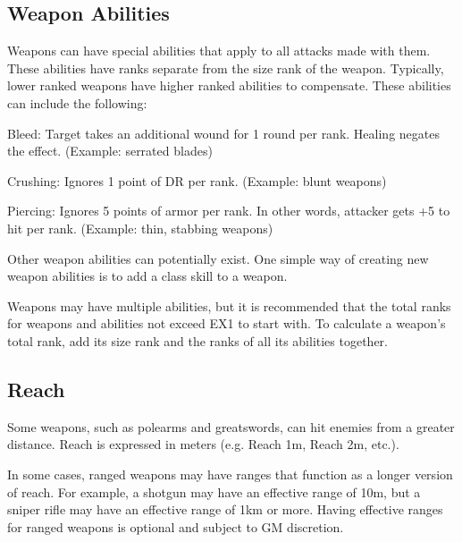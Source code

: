\begin{multicols}{2}

\subsection{Weapon Abilities}
Weapons can have special abilities that apply to all attacks made with them. These abilities have ranks separate from the size rank of the weapon. Typically, lower ranked weapons have higher ranked abilities to compensate. These abilities can include the following:
\begin{wldescription}
\item [Bleed:] Target takes an additional wound for 1 round per rank. Healing negates the effect. (Example: serrated blades)
\item [Crushing:] Ignores 1 point of DR per rank. (Example: blunt weapons)
\item [Piercing:] Ignores 5 points of armor per rank. In other words, attacker gets +5 to hit per rank. (Example: thin, stabbing weapons)
\end{wldescription}
Other weapon abilities can potentially exist. One simple way of creating new weapon abilities is to add a class skill to a weapon.

Weapons may have multiple abilities, but it is recommended that the total ranks for weapons and abilities not exceed EX1 to start with. To calculate a weapon's total rank, add its size rank and the ranks of all its abilities together.


\subsection{Reach}
Some weapons, such as polearms and greatswords, can hit enemies from a greater distance. Reach is expressed in meters (e.g. Reach 1m, Reach 2m, etc.).

In some cases, ranged weapons may have ranges that function as a longer version of reach. For example, a shotgun may have an effective range of 10m, but a sniper rifle may have an effective range of 1km or more. Having effective ranges for ranged weapons is optional and subject to GM discretion.


\end{multicols}
